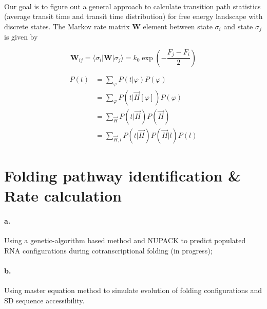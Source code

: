 \documentclass[11pt, a4paper]{article}
\begin{document}

\paragraph{}Our goal is to figure out a general approach to calculate transition path statistics (average transit time and transit time distribution)
 for free energy landscape with discrete states. The Markov rate matrix $\mathbf{W}$ element between state $\sigma_i$ and state $\sigma_j$ is given by

 \begin{equation}
   \mathbf{W}_{ij}=\langle \sigma_i | \mathbf{W} | \sigma_j \rangle = k_0 \exp(-\frac{F_j-F_i}{2})
 \end{equation}

\begin{equation}
  \begin{split}
    P(t)&=\sum_{\varphi} P(t|\varphi)P(\varphi)\\
        &=\sum_{\varphi} P(t|\vec{H}[\varphi])P(\varphi)\\
        &=\sum_{\vec{H}} P(t|\vec{H})P(\vec{H})\\
        &=\sum_{\vec{H},l} P(t|\vec{H})P(\vec{H}|l)P(l)
  \end{split}
\end{equation}


\section{Folding pathway identification \& Rate calculation} \label{section:rate}

\paragraph{a.} Using a genetic-algorithm based method and NUPACK to predict populated RNA configurations during cotranscriptional folding (in progress);
\paragraph{b.} Using master equation method to simulate evolution of folding configurations and SD sequence accessibility.
\end{document}
